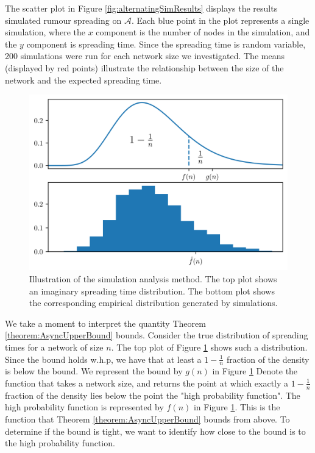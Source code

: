 The scatter plot in Figure \ref{fig:alternatingSimResults} displays the results simulated rumour spreading on $\mathcal{A}$. Each blue point in the plot represents a single simulation, where the $x$ component is the number of nodes in the simulation, and the $y$ component is spreading time. Since the spreading time is random variable, 200 simulations were run for each network size we investigated. The means (displayed by red points) illustrate the relationship between the size of the network and the expected spreading time. 

\begin{figure}[h]
	\centering
	\includegraphics[width=1\textwidth]{./figures/analysis_method_example.png}
	\caption{Illustration of the simulation analysis method. The top plot shows an imaginary spreading time distribution. The bottom plot shows the corresponding empirical distribution generated by simulations.}
	\label{fig:analysisMethod}
\end{figure}


We take a moment to interpret the quantity Theorem \ref{theorem:AsyncUpperBound} bounds. Consider the true distribution of spreading times for a network of size $n$. The top plot of Figure \ref{fig:analysisMethod} shows such a distribution. Since the bound holds w.h.p, we have that at least a $1-\frac{1}{n}$ fraction of the density is below the bound. We represent the bound by $g(n)$ in Figure \ref{fig:analysisMethod} Denote the function that takes a network size, and returns the point at which exactly a $1-\frac{1}{n}$ fraction of the density lies below the point the "high probability function". The high probability function is represented by $f(n)$ in Figure \ref{fig:analysisMethod}. This is the function that Theorem \ref{theorem:AsyncUpperBound} bounds from above. To determine if the bound is tight, we want to identify how close to the bound is to the high probability function.

